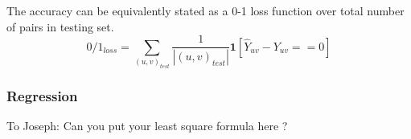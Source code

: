 	The accuracy can be equivalently stated as a 0-1 loss function over total number of pairs in testing set.
	\begin{equation}
		0/1_{loss} = \sum_{(u, v)_{test}} \frac{1}{|(u,v)_{test}|} \textbf{1}[\hat{Y}_{uv} - Y_{uv} == 0]
	\end{equation}
	
	\subsubsection{Regression}
	To Joseph: Can you put your least square formula here ?
